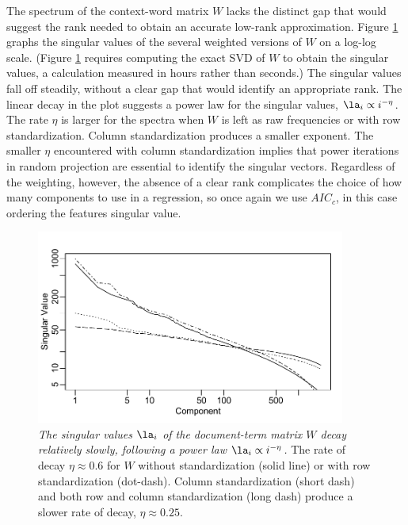 \documentclass[12pt]{article}
\begin{document}
 The spectrum of the context-word matrix $W$ lacks the distinct gap that would
 suggest the rank needed to obtain an accurate low-rank approximation.  Figure
 \ref{fig:spectrum} graphs the singular values of the several weighted versions
 of $W$ on a log-log scale. (Figure \ref{fig:spectrum} requires computing the
 exact SVD of ${W}$ to obtain the singular values, a calculation measured in
  hours rather than seconds.)
  The singular values fall off steadily, without a clear gap
 that would identify an appropriate rank.  The linear decay in the plot suggests
 a power law for the singular values, $\la_i \propto i^{-\eta}$.  The rate
 $\eta$ is larger for the spectra when $W$ is left as raw frequencies or with
 row standardization.  Column standardization produces a smaller
 exponent.  The smaller $\eta$ encountered with column standardization implies
 that power iterations in  random projection are essential to
 identify the singular vectors. Regardless of the weighting, however, the absence of a clear
 rank complicates the choice of how many components to use in a regression, so
 once again we use $AIC_c$, in this case ordering the features singular value.
 
 
 \begin{figure}
 \caption{ 
 	\label{fig:spectrum}
	{\sl The singular values $\la_i$ of the document-term matrix $W$ decay
 relatively slowly, following a power law $\la_i \propto i^{-\eta}$.  } The rate
 of decay $\eta \approx 0.6$ for $W$ without standardization (solid line) or
 with row standardization (dot-dash). Column standardization (short dash) and
 both row and column standardization (long dash) produce a slower rate of decay,
 $\eta \approx 0.25$.}  \centerline{
 \vspace{0.1in}
 \includegraphics[width=4in]{figures/spectrum} }
 \vspace{0.2in}
 \end{figure}
   
\end{document}
